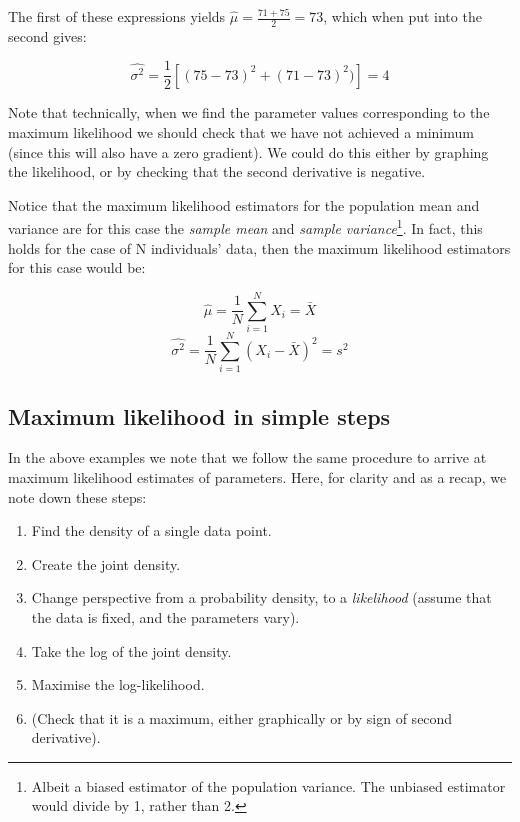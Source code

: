 \documentclass[11pt,fullpage]{book}
\begin{document}
The first of these expressions yields $\hat{\mu} = \frac{71+75}{2} = 73$, which when put into the second gives: 

\begin{equation}
\hat{\sigma^2} = \frac{1}{2}\left[(75-73)^2 + (71-73)^2)\right] = 4
\end{equation}

Note that technically, when we find the parameter values corresponding to the maximum likelihood we should check that we have not achieved a minimum (since this will also have a zero gradient). We could do this either by graphing the likelihood, or by checking that the second derivative is negative.

Notice that the maximum likelihood estimators for the population mean and variance are for this case the \textit{sample mean} and \textit{sample variance}\footnote{Albeit a biased estimator of the population variance. The unbiased estimator would divide by 1, rather than 2.}. In fact, this holds for the case of N individuals' data, then the maximum likelihood estimators for this case would be:

\begin{equation}
\hat{\mu} = \frac{1}{N}\sum\limits_{i=1}^{N} X_i = \bar{X}
\end{equation}
\begin{equation}
\hat{\sigma^2} = \frac{1}{N}\sum\limits_{i=1}^{N}(X_i-\bar{X})^2 = s^2
\end{equation}

\subsection{Maximum likelihood in simple steps}
In the above examples we note that we follow the same procedure to arrive at maximum likelihood estimates of parameters. Here, for clarity and as a recap, we note down these steps:

\begin{enumerate}
\item Find the density of a single data point.
\item Create the joint density.
\item Change perspective from a probability density, to a \textit{likelihood} (assume that the data is fixed, and the parameters vary).
\item Take the log of the joint density.
\item Maximise the log-likelihood.
\item (Check that it is a maximum, either graphically or by sign of second derivative).
\end{enumerate}
\end{document}
